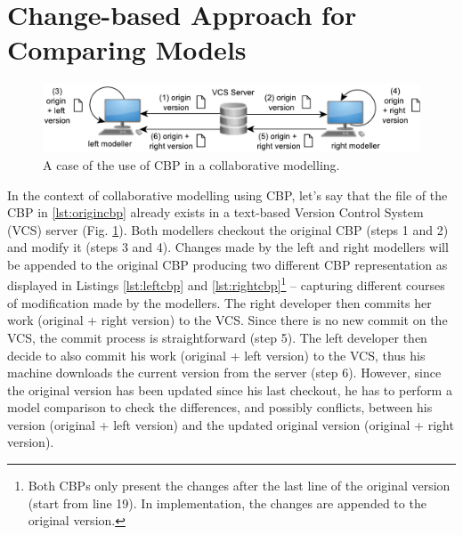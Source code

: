 \documentclass{llncs}
\begin{document}
\section{Change-based Approach for Comparing Models}
\label{sec:change_based_approach_for_comparing_models}

 \begin{figure}
    \includegraphics[width=\linewidth]{images/VCS}
    \caption{A case of the use of CBP in a collaborative modelling.}
    \label{fig:vcs}
\end{figure}

In the context of collaborative modelling using CBP, let's say that the file of the CBP in \ref{lst:origincbp} already exists in a text-based Version Control System (VCS) server (Fig. \ref{fig:vcs}). Both modellers checkout the original CBP (steps 1 and 2) and modify it (steps 3 and 4). Changes made by the left and right modellers will be appended to the original CBP producing two different CBP representation as displayed in Listings \ref{lst:leftcbp} and \ref{lst:rightcbp}\footnote{Both CBPs only present the changes after the last line of the original version (start from line 19). In implementation, the changes are appended to the original version.} -- capturing different courses of modification made by the modellers. The right developer then commits her work (original + right version) to the VCS. Since there is no new commit on the VCS, the commit process is straightforward (step 5). The left developer then decide to also commit his work (original + left version) to the VCS, thus his machine downloads the current version from the server (step 6). However, since the original version has been updated since his last checkout, he has to perform a model comparison to check the differences, and possibly conflicts, between his version (original + left version) and the updated original version (original + right version). 
\end{document}
